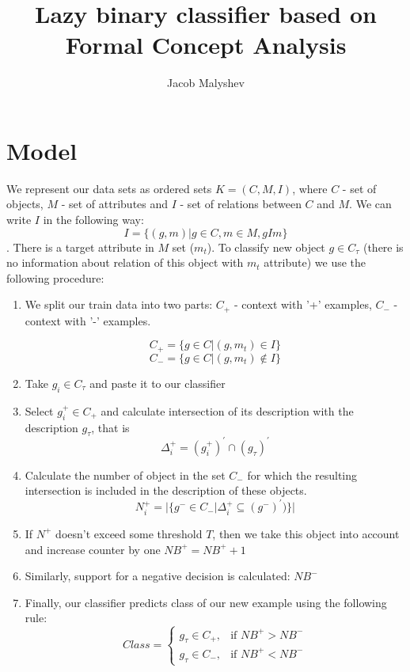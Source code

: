 \documentclass[12t]{article}
\author{Jacob Malyshev}
\title{Lazy binary classifier based on Formal Concept Analysis}
\date{}
\begin{document}
	\maketitle
	
	
\section{Model}
We represent our data sets as ordered sets $K = (C, M, I)$, where $C$ - set of objects, $M$ - set of attributes and $I$ - set of relations between $C$ and $M$. We can write $I$ in the following way:
$$I = \{(g,m) | g \in C, m \in M, gIm \}$$. There is a target attribute in $M$ set ($m_t$). To classify new object $g \in C_{\tau}$ (there is no information about relation of this object with $m_t$ attribute)  we use the following procedure:
\begin{enumerate}
	\item We split our train data into two parts: $C_{+}$ - context with '+' examples, $C_{-}$ - context with '-' examples.
	
	$$C_{+} = \{g \in C | (g, m_t) \in I \}$$
	$$C_{-} = \{g \in C | (g, m_t) \not \in I \}$$
	
	\item Take $g_{i} \in C_{\tau}$  and paste it to our classifier
	\item Select $g_{i}^{+} \in C_{+}$ and calculate intersection of its description with the description $g_{\tau}$, that is 
	$$\Delta_{i}^{+} = (g_{i}^{+})^{'} \cap (g_{\tau})^{'}$$
	\item Calculate the number of object in the set $C_{-}$ for which the resulting intersection is included in the description of these objects. 
	$$N_{i}^{+} = |\{g^{-} \in C_{-} | \Delta_{i}^{+} \subseteq (g^{-})^{'})  \}|$$
	\item If $N^{+}$ doesn't exceed some threshold $T$, then we take this object into account and increase counter by one $NB^{+} = NB^{+} + 1$
	\item Similarly, support for a negative decision is calculated: $NB^{-}$
	\item Finally, our classifier predicts class of our new example using the following rule:
	$$Class = \begin{cases} g_{\tau} \in C_{+}, & \mbox{if } NB^{+} > NB^{-} \\ g_{\tau} \in C_{-}, & \mbox{if } NB^{+} < NB^{-}  \end{cases}$$
\end{enumerate}
\end{document}
